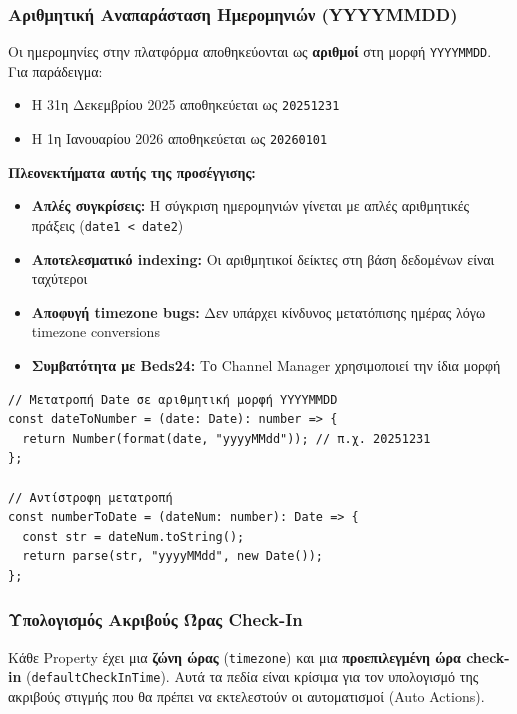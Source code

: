 \documentclass[
	12pt, %
	oneside, %
	greek,
	onehalfspacing, %
	liststotoc, %
	toctotoc, %
	parskip, %
	headsepline, %
]{MastersDoctoralThesis} %
\newcommand{\code}[1]{\texttt{#1}}
\begin{document}
\subsubsection{Αριθμητική Αναπαράσταση Ημερομηνιών (YYYYMMDD)}

Οι ημερομηνίες στην πλατφόρμα αποθηκεύονται ως \textbf{αριθμοί} στη μορφή \code{YYYYMMDD}. Για παράδειγμα:
\begin{itemize}
    \item Η 31η Δεκεμβρίου 2025 αποθηκεύεται ως \code{20251231}
    \item Η 1η Ιανουαρίου 2026 αποθηκεύεται ως \code{20260101}
\end{itemize}

\textbf{Πλεονεκτήματα αυτής της προσέγγισης:}
\begin{itemize}
    \item \textbf{Απλές συγκρίσεις:} Η σύγκριση ημερομηνιών γίνεται με απλές αριθμητικές πράξεις (\code{date1 < date2})
    \item \textbf{Αποτελεσματικό indexing:} Οι αριθμητικοί δείκτες στη βάση δεδομένων είναι ταχύτεροι
    \item \textbf{Αποφυγή timezone bugs:} Δεν υπάρχει κίνδυνος μετατόπισης ημέρας λόγω timezone conversions
    \item \textbf{Συμβατότητα με Beds24:} Το Channel Manager χρησιμοποιεί την ίδια μορφή
\end{itemize}

\begin{lstlisting}[caption={Μετατροπή ημερομηνίας σε αριθμητική μορφή}]
// Μετατροπή Date σε αριθμητική μορφή YYYYMMDD
const dateToNumber = (date: Date): number => {
  return Number(format(date, "yyyyMMdd")); // π.χ. 20251231
};

// Αντίστροφη μετατροπή
const numberToDate = (dateNum: number): Date => {
  const str = dateNum.toString();
  return parse(str, "yyyyMMdd", new Date());
};
\end{lstlisting}

\subsubsection{Υπολογισμός Ακριβούς Ώρας Check-In}

Κάθε Property έχει μια \textbf{ζώνη ώρας} (\code{timezone}) και μια \textbf{προεπιλεγμένη ώρα check-in} (\code{defaultCheckInTime}). Αυτά τα πεδία είναι κρίσιμα για τον υπολογισμό της ακριβούς στιγμής που θα πρέπει να εκτελεστούν οι αυτοματισμοί (Auto Actions).
\end{document}
